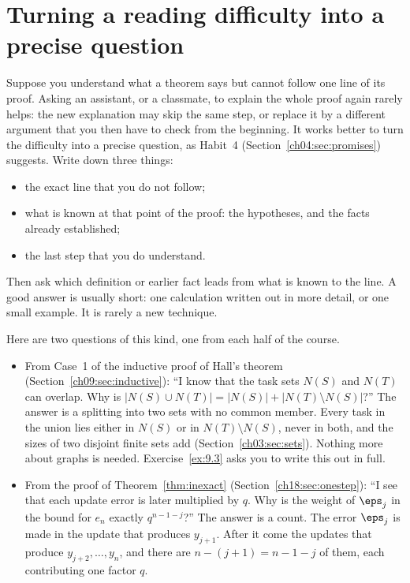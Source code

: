 \section{Turning a reading difficulty into a precise question}\label{appE:sec:question}
Suppose you understand what a theorem says but cannot follow one line of its proof. Asking an assistant, or a classmate, to explain the whole proof again rarely helps: the new explanation may skip the same step, or replace it by a different argument that you then have to check from the beginning. It works better to turn the difficulty into a precise question, as Habit~4 (Section~\ref{ch04:sec:promises}) suggests. Write down three things:
\begin{itemize}
\item the exact line that you do not follow;
\item what is known at that point of the proof: the hypotheses, and the facts already established;
\item the last step that you do understand.
\end{itemize}
Then ask which definition or earlier fact leads from what is known to the line. A good answer is usually short: one calculation written out in more detail, or one small example. It is rarely a new technique.

Here are two questions of this kind, one from each half of the course.
\begin{itemize}
\item From Case~1 of the inductive proof of Hall's theorem (Section~\ref{ch09:sec:inductive}): ``I know that the task sets $N(S)$ and $N(T)$ can overlap. Why is $|N(S)\cup N(T)|=|N(S)|+|N(T)\setminus N(S)|$?'' The answer is a splitting into two sets with no common member. Every task in the union lies either in $N(S)$ or in $N(T)\setminus N(S)$, never in both, and the sizes of two disjoint finite sets add (Section~\ref{ch03:sec:sets}). Nothing more about graphs is needed. Exercise~\ref{ex:9.3} asks you to write this out in full.
\item From the proof of Theorem~\ref{thm:inexact} (Section~\ref{ch18:sec:onestep}): ``I see that each update error is later multiplied by $q$. Why is the weight of $\eps_j$ in the bound for $e_n$ exactly $q^{n-1-j}$?'' The answer is a count. The error $\eps_j$ is made in the update that produces $y_{j+1}$. After it come the updates that produce $y_{j+2},\ldots,y_n$, and there are $n-(j+1)=n-1-j$ of them, each contributing one factor $q$.
\end{itemize}

